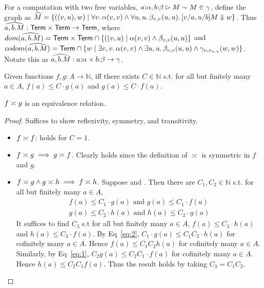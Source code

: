 For a computation with two free variables, $a {:} \alpha, b {:} \beta \rhd M \sim M \in \gamma$, define the graph as 
$\widehat{M} = \{((v,u),w) \mid \forall v.\, \alpha(v,v) \land \forall u,u.\, \beta_{v,v}(u,u).\, [v/a,u/b]M \Downarrow w\}$. 
Thus $\widehat{a,b.M} : \mathsf{Term} \times \mathsf{Term} \to \mathsf{Term}$, 
where $dom(\widehat{a,b.M}) = \mathsf{Term} \times \mathsf{Term} \cap \{((v,u) \mid \alpha(v,v) \land \beta_{v,v}(u,u)\}$ and 
$codom(\widehat{a,b.M}) = \mathsf{Term}  \cap \{w \mid \exists v,v.\, \alpha(v,v) \land \exists u,u.\, \beta_{v,v}(u,u) \land \gamma_{v,v_{u,u}}(w,w)\}$.
Notate this as $\widehat{a,b.M} : a {:} \alpha \times b {:} \beta \to \gamma$.

\begin{definition}
  Given functions $f, g : A \to \mathbb{N}$, 
 iff there exists $C \in \mathbb{N}$ s.t. for all but finitely many $a \in A$,  
 $f(a) \le C \cdot g(a)$ and $g(a) \le C \cdot f(a)$.
\end{definition}

\begin{lemma}\label{lemma:asymp}
  $f \asymp g$ is an equivalence relation.
\end{lemma}

\begin{proof}
  Suffices to show reflexivity, symmetry, and transitivity.
  \begin{itemize}
    \item $f \asymp f$: holds for $C = 1$.
    \item $f \asymp g \implies g \asymp f$. Clearly holds since the definition of $\asymp$ is symmetric in $f$ and $g$.
    \item $f \asymp g \land g \asymp h \implies f \asymp h$. Suppose  and .
      Then there are $C_1,C_2 \in \mathbb{N}$ s.t. for all but finitely many $a \in A$, 
      \begin{gather}
        f(a) \le C_1 \cdot g(a) \text{ and } g(a) \le C_1 \cdot f(a) \label{eq:1}\\
        g(a) \le C_2 \cdot h(a) \text{ and } h(a) \le C_2 \cdot g(a) \label{eq:2}
      \end{gather}
      It suffices to find $C_3$ s.t for all but finitely many $a \in A$,  $f(a) \le C_3 \cdot h(a)$ and $h(a) \le C_3 \cdot f(a)$.
      By Eq~\ref{eq:2}, $C_1 \cdot g(a) \le C_1 C_2 \cdot h(a)$ for cofinitely many $a \in A$. Hence 
      $f(a) \le C_1 C_2 h(a)$ for cofinitely many $a \in A$. Similarly, by Eq~\ref{eq:1}, $C_2 g(a) \le C_2 C_1 \cdot f(a)$ for cofinitely many $a \in A$. Hence 
      $h(a) \le C_2 C_1 f(a)$. Thus the result holds by taking $C_3 = C_1 C_2$.
  \end{itemize}
\end{proof}

